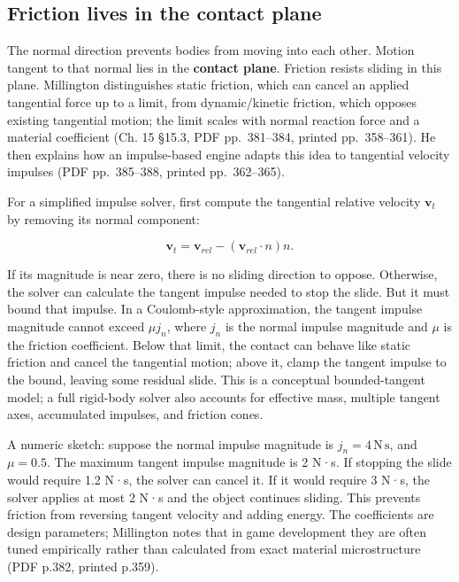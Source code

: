 \subsection{Friction lives in the contact plane}\label{06-engine-ii-ch033-friction-lives-in-the-contact-plane}

The normal direction prevents bodies from moving into each other. Motion tangent to that normal lies in the \textbf{contact plane}. Friction resists sliding in this plane. Millington distinguishes static friction, which can cancel an applied tangential force up to a limit, from dynamic/kinetic friction, which opposes existing tangential motion; the limit scales with normal reaction force and a material coefficient (Ch. 15 §15.3, PDF pp.~381--384, printed pp.~358--361). He then explains how an impulse-based engine adapts this idea to tangential velocity impulses (PDF pp.~385--388, printed pp.~362--365).

For a simplified impulse solver, first compute the tangential relative velocity \(\mathbf{v}_t\) by removing its normal component:

\[
\mathbf{v}_t=\mathbf{v}_{rel}-(\mathbf{v}_{rel}\cdot n)n.
\]

If its magnitude is near zero, there is no sliding direction to oppose. Otherwise, the solver can calculate the tangent impulse needed to stop the slide. But it must bound that impulse. In a Coulomb-style approximation, the tangent impulse magnitude cannot exceed \(\mu j_n\), where \(j_n\) is the normal impulse magnitude and \(\mu\) is the friction coefficient. Below that limit, the contact can behave like static friction and cancel the tangential motion; above it, clamp the tangent impulse to the bound, leaving some residual slide. This is a conceptual bounded-tangent model; a full rigid-body solver also accounts for effective mass, multiple tangent axes, accumulated impulses, and friction cones.

A numeric sketch: suppose the normal impulse magnitude is \(j_n=4\,\mathrm{N\,s}\), and \(\mu=0.5\). The maximum tangent impulse magnitude is 2 N·s. If stopping the slide would require 1.2 N·s, the solver can cancel it. If it would require 3 N·s, the solver applies at most 2 N·s and the object continues sliding. This prevents friction from reversing tangent velocity and adding energy. The coefficients are design parameters; Millington notes that in game development they are often tuned empirically rather than calculated from exact material microstructure (PDF p.382, printed p.359).

